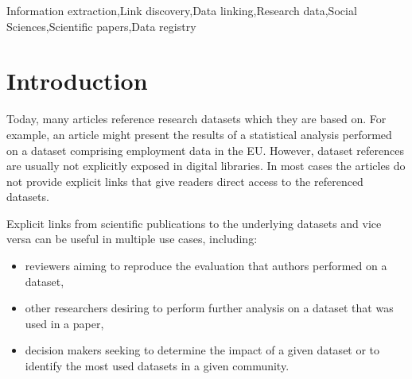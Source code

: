 \documentclass{IOS-Book-Article}
\begin{document}
\begin{frontmatter}
\begin{abstract}
\end{abstract}

\begin{keyword}
Information extraction\sep Link discovery\sep Data linking\sep Research data\sep Social Sciences\sep Scientific papers\sep Data registry
\end{keyword}
\end{frontmatter}
\section{Introduction}
Today, 
many articles reference research datasets which they are based on.
For example, an article might present the results of a statistical analysis performed on a dataset comprising employment data in the EU.
However, dataset references are usually not explicitly exposed in digital libraries.
In most cases the articles do not provide explicit links that give readers direct access to the referenced datasets. 

Explicit links from scientific publications to the underlying datasets and vice versa can be useful in multiple use cases, including:
\begin{itemize}
	\item reviewers aiming to reproduce the evaluation that authors performed on a dataset, 
	\item other researchers desiring to perform further analysis on a dataset that was used in a paper,
	\item decision makers seeking to determine the impact of a given dataset or to identify the most used datasets in a given community.
\end{itemize}%
\end{document}

